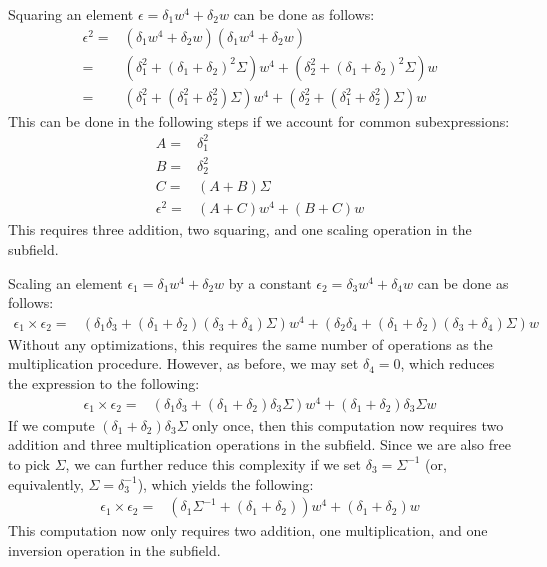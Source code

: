 Squaring an element $\epsilon = \delta_1 w^4 + \delta_2 w$ can be done as follows:
\begin{align*}
\epsilon^2 = & (\delta_1 w^4 + \delta_2 w)(\delta_1 w^4 + \delta_2 w) \\
= & (\delta_1^2 + (\delta_1 + \delta_2)^2\Sigma) w^4 + (\delta_2^2 + (\delta_1 + \delta_2)^2\Sigma) w \\
= & (\delta_1^2 + (\delta_1^2 + \delta_2^2)\Sigma) w^4 + (\delta_2^2 + (\delta_1^2 + \delta_2^2)\Sigma) w
\end{align*}
This can be done in the following steps if we account for common subexpressions:
\begin{align*}
A = & \delta_1^2 \\
B = & \delta_2^2 \\
C = & (A + B)\Sigma \\
\epsilon^2 = & (A + C)w^4 + (B + C)w
\end{align*}
This requires three addition, two squaring, and one scaling operation in the subfield.

Scaling an element $\epsilon_1 = \delta_1 w^4 + \delta_2 w$ by a constant $\epsilon_2 = \delta_3 w^4 + \delta_4 w$ can be done as follows:
\begin{align*}
\epsilon_1 \times \epsilon_2 = & (\delta_1\delta_3 + (\delta_1 + \delta_2)(\delta_3 + \delta_4)\Sigma) w^4 + (\delta_2\delta_4 + (\delta_1 + \delta_2)(\delta_3 + \delta_4)\Sigma) w
\end{align*}
Without any optimizations, this requires the same number of operations as the multiplication procedure. However, as before, we may set $\delta_4 = 0$, which reduces the expression to the following:
\begin{align*}
\epsilon_1 \times \epsilon_2 = & (\delta_1\delta_3 + (\delta_1 + \delta_2)\delta_3\Sigma) w^4 + (\delta_1 + \delta_2)\delta_3\Sigma w 
\end{align*}
If we compute $(\delta_1 + \delta_2)\delta_3\Sigma$ only once, then this computation now requires two addition and three multiplication operations in the subfield. Since we are also free to pick $\Sigma$, we can further reduce this complexity if we set $\delta_3 = \Sigma^{-1}$ (or, equivalently, $\Sigma = \delta_3^{-1}$), which yields the following:
\begin{align*}
\epsilon_1 \times \epsilon_2 = & (\delta_1\Sigma^{-1} + (\delta_1 + \delta_2)) w^4 + (\delta_1 + \delta_2) w 
\end{align*}
This computation now only requires two addition, one multiplication, and one inversion operation in the subfield. 

